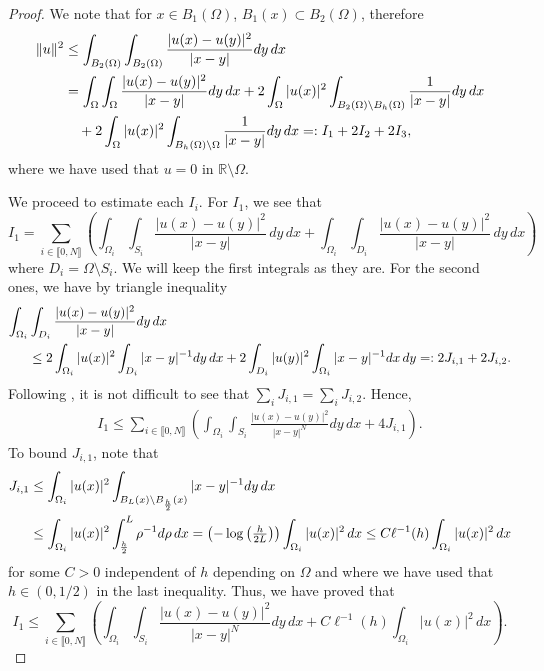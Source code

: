 \documentclass[11 pt]{article}
\newcommand\inter[1]{\llbracket #1\rrbracket}
\numberwithin{equation}{section}
\def\R{\mathbb{R}}
\begin{document}
\begin{proof}
We note that for $x\in B_1(\Omega)$, $B_1(x)\subset B_2(\Omega)$, therefore
%
\begin{align}\notag
    \|u\|^2&\leq \int_{B_2(\Omega)}\int_{B_2(\Omega)}\frac{|u(x)-u(y)|^2}{|x-y|}dy\, dx\\ \notag
    &=\int_{\Omega}\int_{\Omega}\frac{|u(x)-u(y)|^2}{|x-y|}dy\,dx+2\int_{\Omega}|u(x)|^2\int_{B_2(\Omega)\setminus B_h(\Omega)}\frac{1}{|x-y|}dy\,dx \\ \label{eq:part_init}
    &\quad +2\int_{\Omega}|u(x)|^2\int_{B_h(\Omega)\setminus \Omega}\frac{1}{|x-y|}dy\,dx =: I_1+2I_2+2I_3,
\end{align}
%
where we have used that $u=0$ in $\R\setminus \Omega$. 

We proceed to estimate each $I_i$. For $I_1$, we see that  
%
\begin{equation}
    I_1=\sum_{i\in\inter{0,N}}\left(\int_{\Omega_i}\int_{S_i}\frac{|u(x)-u(y)|^2}{|x-y|}\,dy\,dx+\int_{\Omega_i}\int_{D_i}\frac{|u(x)-u(y)|^2}{|x-y|}\,dy\,dx\right)
\end{equation}
%
where $D_i=\Omega\setminus S_i$. We will keep the first integrals as they are. For the second ones, we have by triangle inequality
%
\begin{align}\notag
    \int_{\Omega_i}&\int_{D_i} \frac{|u(x)-u(y)|^2}{|x-y|}dy\,dx \\
    &\leq 2\int_{\Omega_i}|u(x)|^2\int_{D_i}|x-y|^{-1}dy\,dx+2\int_{D_i}|u(y)|^2\int_{\Omega_i}|x-y|^{-1}dx\,dy=:2J_{i,1}+2J_{i,2}.
\end{align}
%
Following \cite[Prop. 1.2.24]{Bor17}, it is not difficult to see that $\sum_{i}{J_{i,1}}=\sum_{i}{J_{i,2}}$. Hence,
%
\begin{align}\label{eq:est_I1}
    I_1\leq \sum_{i\in\inter{0,N}}\left(\int_{\Omega_i}\int_{S_i}\frac{|u(x)-u(y)|^2}{|x-y|^N}dy\,dx+4 J_{i,1}\right).
\end{align}
%
To bound $J_{i,1}$, note that
%
\begin{align}\notag
    J_{i,1}&\leq \int_{\Omega_i}|u(x)|^2\int_{B_{L}(x)\setminus B_{\frac{h}{2}}(x)}|x-y|^{-1}dy\,dx \\\label{eq:est_Ij1}
    &\leq \int_{\Omega_i}|u(x)|^2\int_{\frac{h}{2}}^{L}\rho^{-1}d\rho\,dx=\left(-\log\left(\tfrac{h}{2L}\right)\right)\int_{\Omega_i}|u(x)|^2\,dx\leq C\ell^{-1} (h)\int_{\Omega_i}|u(x)|^2\,dx
\end{align}
%
for some $C>0$ independent of $h$ depending on $\Omega$ and where we have used that $h\in(0,1/2)$ in the last inequality. Thus, we have proved that
%
\begin{equation}\label{eq:est_I1_final}
    I_1\leq \sum_{i\in\inter{0,N}}\left(\int_{\Omega_i}\int_{S_i}\frac{|u(x)-u(y)|^2}{|x-y|^N}dy\,dx + C\ell^{-1}(h)\int_{\Omega_i}|u(x)|^2\,dx\right).
\end{equation}
%


\end{proof}
\end{document}
